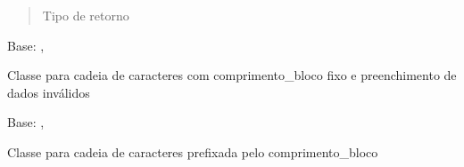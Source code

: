 \documentclass[letterpaper,10pt,brazil]{sphinxmanual}
\begin{document}
\begin{fulllineitems}
\begin{fulllineitems}
\begin{quote}
\begin{description}
\item[{Tipo de retorno}] \leavevmode
\sphinxAtStartPar
{}

\end{description}\end{quote}

\end{fulllineitems}


\end{fulllineitems}


\begin{fulllineitems}
\label{\detokenize{estrutarq.campo:estrutarq.campo.campo_cadeia.CampoCadeiaFixo}}
\pysigstartsignatures
{}
\pysigstopsignatures
\sphinxAtStartPar
Base: {\hyperref[\detokenize{estrutarq.dado:estrutarq.dado.DadoFixo}]{}}, {\hyperref[\detokenize{estrutarq.campo:estrutarq.campo.campo_cadeia.CampoCadeiaBasico}]{}}

\sphinxAtStartPar
Classe para cadeia de caracteres com comprimento\_bloco fixo e preenchimento
de dados inválidos

\end{fulllineitems}


\begin{fulllineitems}
\label{\detokenize{estrutarq.campo:estrutarq.campo.campo_cadeia.CampoCadeiaPrefixado}}
\pysigstartsignatures
{}
\pysigstopsignatures
\sphinxAtStartPar
Base: {\hyperref[\detokenize{estrutarq.dado:estrutarq.dado.DadoPrefixado}]{}}, {\hyperref[\detokenize{estrutarq.campo:estrutarq.campo.campo_cadeia.CampoCadeiaBasico}]{}}

\sphinxAtStartPar
Classe para cadeia de caracteres prefixada pelo comprimento\_bloco

\end{fulllineitems}
\end{document}
